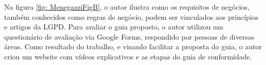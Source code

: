 \documentclass[
	12pt,				%
	openright,			%
	oneside,			%
	a4paper,			%
	english,			%
	french,				%
	spanish,			%
	brazil,				%
	]{abntex2}
\begin{document}

Na figura \ref{fig: MenegazziFigB}, o autor ilustra como os requisitos de negócios, também conhecidos como regras de negócio, podem ser vinculados aos princípios e artigos da LGPD. Para avaliar o guia proposto, o autor utilizou um questionário de avaliação via Google Forms, respondido por pessoas de diversas áreas. Como resultado do trabalho, e visando facilitar a proposta do guia, o autor criou um website com vídeos explicativos e as etapas do guia de conformidade.
\end{document}
